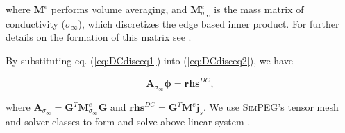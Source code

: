 \documentclass[extra,mreferee]{gji}
\newcommand{\SimPEG}{\textsc{SimPEG}\xspace}
\newcommand{\siginf}{\sigma_\infty}
\newcommand{\dgrad}{{\mathbf G}}
\newcommand{\Ace}{{\mathbf A_c^e}}
\newcommand{\diag}{\mathbf{diag}}
\newcommand{\M}{{\mathbf M}}
\newcommand{\MeSigInf}{{\M^e_{\sigma_\infty}}}
\newcommand{\Me}{{\M^e}}
\renewcommand {\dj}  { {\mathbf{j} } }
\newcommand{\vol}{\mathbf{v}}
\newcommand{\A}{\mathbf{A}}
\begin{document}
where $\mathbf{M}^e$ performs volume averaging, and $\mathbf{M}^e_{\siginf}$ is the mass matrix of conductivity ($\siginf$), which discretizes the edge based inner product.
For further details on the formation of this matrix see \cite{Eldadbook}.

By substituting eq. (\ref{eq:DCdisceq1}) into (\ref{eq:DCdisceq2}), we have
\begin{linenomath*}
\begin{equation}
  \A_{\siginf}\boldsymbol{\phi} = \mathbf{rhs}^{DC},
  \label{eq:DCdiscLin}
\end{equation}
\end{linenomath*}
where $\A_{\siginf} = \dgrad^T \MeSigInf\dgrad$ and $\mathbf{rhs}^{DC} = \dgrad^T \Me\dj_s$. We use \SimPEG's tensor mesh and solver classes to form and solve above linear system \cite[]{Cockett2015}.

\end{document}
